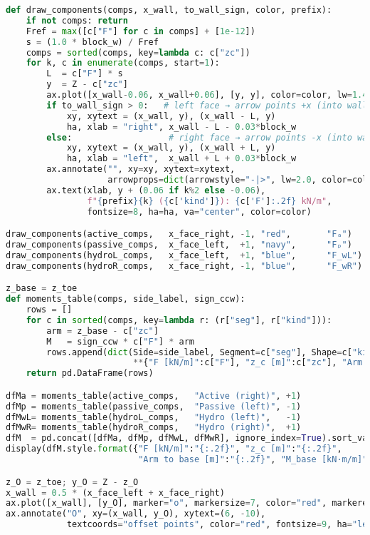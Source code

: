 \begin{lstlisting}[language=Python]
def draw_components(comps, x_wall, to_wall_sign, color, prefix):
    if not comps: return
    Fref = max([c["F"] for c in comps] + [1e-12])
    s = (1.0 * block_w) / Fref
    comps = sorted(comps, key=lambda c: c["zc"])
    for k, c in enumerate(comps, start=1):
        L  = c["F"] * s
        y  = Z - c["zc"]
        ax.plot([x_wall-0.06, x_wall+0.06], [y, y], color=color, lw=1.4)
        if to_wall_sign > 0:   # left face → arrow points +x (into wall)
            xy, xytext = (x_wall, y), (x_wall - L, y)
            ha, xlab = "right", x_wall - L - 0.03*block_w
        else:                   # right face → arrow points -x (into wall)
            xy, xytext = (x_wall, y), (x_wall + L, y)
            ha, xlab = "left",  x_wall + L + 0.03*block_w
        ax.annotate("", xy=xy, xytext=xytext,
                    arrowprops=dict(arrowstyle="-|>", lw=2.0, color=color, mutation_scale=8.0))
        ax.text(xlab, y + (0.06 if k%2 else -0.06),
                f"{prefix}{k} ({c['kind']}): {c['F']:.2f} kN/m",
                fontsize=8, ha=ha, va="center", color=color)

draw_components(active_comps,   x_face_right, -1, "red",       "Fₐ")
draw_components(passive_comps,  x_face_left,  +1, "navy",      "Fₚ")
draw_components(hydroL_comps,   x_face_left,  +1, "blue",      "F_wL")
draw_components(hydroR_comps,   x_face_right, -1, "blue",      "F_wR")

z_base = z_toe
def moments_table(comps, side_label, sign_ccw):
    rows = []
    for c in sorted(comps, key=lambda r: (r["seg"], r["kind"])):
        arm = z_base - c["zc"]
        M   = sign_ccw * c["F"] * arm
        rows.append(dict(Side=side_label, Segment=c["seg"], Shape=c["kind"],
                         **{"F [kN/m]":c["F"], "z_c [m]":c["zc"], "Arm to base [m]":arm, "M_base [kN·m/m]":M}))
    return pd.DataFrame(rows)

dfMa = moments_table(active_comps,   "Active (right)", +1)
dfMp = moments_table(passive_comps,  "Passive (left)", -1)
dfMwL= moments_table(hydroL_comps,   "Hydro (left)",   -1)
dfMwR= moments_table(hydroR_comps,   "Hydro (right)",  +1)
dfM  = pd.concat([dfMa, dfMp, dfMwL, dfMwR], ignore_index=True).sort_values(["Side","Segment","Shape"])
display(dfM.style.format({"F [kN/m]":"{:.2f}", "z_c [m]":"{:.2f}",
                          "Arm to base [m]":"{:.2f}", "M_base [kN·m/m]":"{:+.2f}"}))

z_O = z_toe; y_O = Z - z_O
x_wall = 0.5 * (x_face_left + x_face_right)
ax.plot([x_wall], [y_O], marker="o", markersize=7, color="red", markeredgewidth=0.8, zorder=21, clip_on=False)
ax.annotate("O", xy=(x_wall, y_O), xytext=(6, -10),
            textcoords="offset points", color="red", fontsize=9, ha="left", va="top")


\end{lstlisting}
